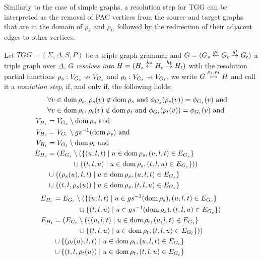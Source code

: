 Similarly to the case of simple graphs, a resolution step for TGG can be interpreted as the removal of PAC vertices from the source and target graphs that are in the domain of $\rho_s$ and $\rho_t$, followed by the redirection of their adjacent edges to other vertices.

\begin{definition}
	\label{def:tresolv}
	Let $TGG = (\Sigma, \Delta, S, P)$ be a triple graph grammar and $G = (G_s \overset{gs}{\leftarrow} G_c \overset{gt}{\rightarrow} G_t)$ a triple graph over $\Delta$, $G$ \emph{resolves into} $H = (H_s \overset{hs}{\leftarrow} H_c \overset{ht}{\rightarrow} H_t)$ with the resolution partial functions $\rho_s: V_{G_s} \nrightarrow V_{G_s}$ and $\rho_t: V_{G_t} \nrightarrow V_{G_t}$, we write $G \overset{\rho_s, \rho_t}{\rightarrowtail} H$ and call it a \emph{resolution step}, if, and only if, the following holds:
	\begin{align*}
	& \forall v \in \operatorname{dom} \rho_s . \; \rho_s(v) \notin \operatorname{dom} \rho_s \text{ and } \phi_{G_s}(\rho_s(v)) = \phi_{G_s}(v) \text{ and}\\
	& \forall v \in \operatorname{dom} \rho_t . \; \rho_t(v) \notin \operatorname{dom} \rho_t \text{ and } \phi_{G_t}(\rho_t(v)) = \phi_{G_t}(v) \text{ and}\\
	V_{H_s} & = V_{G_s} \setminus \operatorname{dom}  \rho_s\text{ and}\\
	V_{H_c} & = V_{G_c} \setminus gs^{-1}(\operatorname{dom}  \rho_s) \text{ and}\\
	V_{H_t} & = V_{G_t} \setminus \operatorname{dom}  \rho_t\text{ and}\\
	E_{H_s} & = (E_{G_s} \setminus (\{(u,l,t) \; | \; u \in \operatorname{dom} \rho_s, (u,l,t) \in E_{G_s}\} \\
			&\hspace{3.5em} \cup \{(t,l,u) \; | \; u \in \operatorname{dom} \rho_s, (t,l,u) \in E_{G_s}\}))\\
	& \cup \{(\rho_s(u),l,t) \; | \; u \in \operatorname{dom} \rho_s, (u,l,t) \in E_{G_s}\} \\
	& \cup \{(t,l,\rho_s(u)) \; | \; u \in \operatorname{dom} \rho_s, (t,l,u) \in E_{G_s}\}
	\end{align*}
	\begin{align*}
	E_{H_c} & = E_{G_c} \setminus (\{(u,l,t) \; | \; u \in gs^{-1}(\operatorname{dom} \rho_s), (u,l,t) \in E_{G_c}\} \\
	&\hspace{3.5em} \cup \{(t,l,u) \; | \; u \in gs^{-1}(\operatorname{dom} \rho_s), (t,l,u) \in E_{G_c}\}) \\
	E_{H_t} & = (E_{G_t} \setminus (\{(u,l,t) \; | \; u \in \operatorname{dom} \rho_t, (u,l,t) \in E_{G_t}\} \\
	&\hspace{3.5em} \cup \{(t,l,u) \; | \; u \in \operatorname{dom} \rho_t, (t,l,u) \in E_{G_t}\}))\\
	& \cup \{(\rho_t(u),l,t) \; | \; u \in \operatorname{dom} \rho_t, (u,l,t) \in E_{G_t}\} \\
	& \cup \{(t,l,\rho_t(u)) \; | \; u \in \operatorname{dom} \rho_t, (t,l,u) \in E_{G_t}\}
	\end{align*}
\end{definition}

